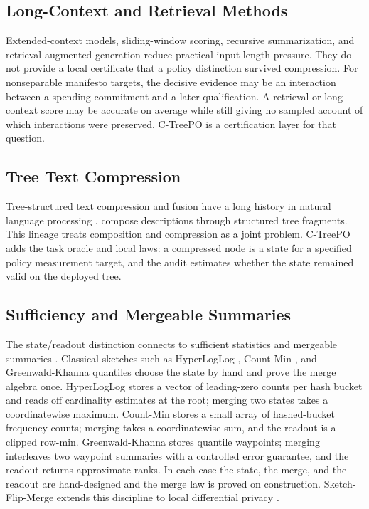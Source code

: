 \subsection{Long-Context and Retrieval Methods}

Extended-context models, sliding-window scoring, recursive summarization, and
retrieval-augmented generation reduce practical input-length pressure. They do
not provide a local certificate that a policy distinction survived
compression. For nonseparable manifesto targets, the decisive evidence may be
an interaction between a spending commitment and a later qualification. A
retrieval or long-context score may be accurate on average while still giving
no sampled account of which interactions were preserved. C-TreePO is a
certification layer for that question.

\subsection{Tree Text Compression}

Tree-structured text compression and fusion have a long history in natural
language processing \citep{KnightMarcu2000SentenceCompression,BarzilayMcKeown2005SentenceFusion,ClarkeLapata2008ILPSentenceCompression}.
\citet{KuznetsovaEtAl2014TreeTalk} compose descriptions through structured
tree fragments. This lineage treats composition and compression as a joint
problem. C-TreePO adds the task oracle and local laws: a compressed node is a
state for a specified policy measurement target, and the audit estimates
whether the state remained valid on the deployed tree.

\subsection{Sufficiency and Mergeable Summaries}

The state/readout distinction connects to sufficient statistics
\citep{Fisher1922,Blackwell1953} and mergeable summaries
\citep{Agarwal2013MergeableTODS}. Classical sketches such as
HyperLogLog \citep{FlajoletEtAl2007}, Count-Min
\citep{CormodeMuthukrishnan2005}, and Greenwald-Khanna quantiles
\citep{GreenwaldKhanna2001} choose the state by hand and prove the
merge algebra once. HyperLogLog stores a vector of leading-zero
counts per hash bucket and reads off cardinality estimates at the
root; merging two states takes a coordinatewise maximum. Count-Min
stores a small array of hashed-bucket frequency counts; merging
takes a coordinatewise sum, and the readout is a clipped row-min.
Greenwald-Khanna stores quantile waypoints; merging interleaves two
waypoint summaries with a controlled error guarantee, and the
readout returns approximate ranks. In each case the state, the
merge, and the readout are hand-designed and the merge law is proved
on construction. Sketch-Flip-Merge extends this discipline to local
differential privacy \citep{HehirTingCormode2023SFM}.

